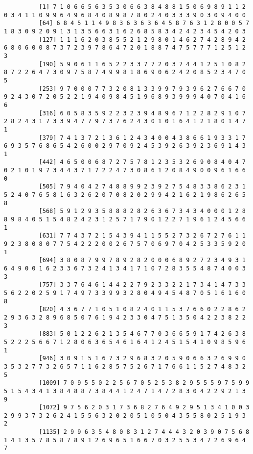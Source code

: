 \documentclass{article}
\begin{document}
\begin{itemize}
	\begin{scriptsize}
		\begin{verbatim}
		  [1] 7 1 0 6 6 5 6 3 5 3 0 6 6 3 8 4 8 8 1 5 0 6 9 8 9 1 1 2 0 3 4 1 1 0 9 9 6 4 9 6 8 4 0 8 9 8 7 8 0 2 4 0 3 3 3 9 0 3 0 9 4 0 0
		  [64] 6 8 4 5 1 1 4 9 8 3 6 3 6 3 6 4 5 8 7 6 3 1 2 8 0 0 5 7 1 8 3 0 9 2 0 9 1 3 1 3 5 6 6 3 1 6 2 6 8 5 8 3 4 2 4 2 3 4 5 4 2 0 3
		  [127] 1 1 1 6 2 0 3 8 5 5 2 1 2 9 8 0 1 4 6 2 7 4 2 8 9 4 2 6 8 0 6 0 0 8 7 3 7 2 3 9 7 8 6 4 7 2 0 1 8 8 7 4 7 5 7 7 7 1 2 5 1 2 3
		  [190] 5 9 0 6 1 1 6 5 2 2 3 3 7 7 2 0 3 7 4 4 1 2 5 1 0 8 2 8 7 2 2 6 4 7 3 0 9 7 5 8 7 4 9 9 8 1 8 6 9 0 6 2 4 2 0 8 5 2 3 4 7 0 5
		  [253] 9 7 0 0 0 7 7 3 2 0 8 1 3 3 9 9 7 9 3 9 6 2 7 6 6 7 0 9 2 4 3 0 7 2 0 5 2 2 1 9 4 0 9 8 4 5 1 9 6 8 9 3 9 9 9 4 0 7 0 4 1 6 6
		  [316] 6 0 5 8 3 5 9 2 2 3 2 3 9 4 8 9 6 7 1 2 2 8 2 9 1 0 7 2 8 2 4 3 1 7 3 3 9 4 7 7 9 7 3 7 6 2 4 3 0 1 0 1 6 4 1 2 1 8 0 1 4 7 1
		  [379] 7 4 1 3 7 2 1 3 6 1 2 4 3 4 0 0 4 3 8 6 6 1 9 3 3 1 7 6 9 3 5 7 6 8 6 5 4 2 6 0 0 2 9 7 0 9 2 4 5 3 9 2 6 3 9 2 3 6 9 1 4 3 1
		  [442] 4 6 5 0 0 6 8 7 2 7 5 7 8 1 2 3 5 3 2 6 9 0 8 4 0 4 7 0 2 1 0 1 9 7 3 4 4 3 7 1 7 2 2 4 7 3 0 8 6 1 2 0 8 4 9 0 0 9 6 1 6 6 0
		  [505] 7 9 4 0 4 2 7 4 8 8 9 9 2 3 9 2 7 5 4 8 3 3 8 6 2 3 1 5 2 4 0 7 6 5 8 1 6 3 2 6 2 0 7 0 8 2 0 2 9 9 4 2 1 6 2 1 9 8 6 2 6 5 8
		  [568] 5 9 1 2 9 3 5 8 8 8 2 8 2 6 3 6 7 3 4 3 4 0 0 0 1 2 8 8 9 8 4 0 5 1 5 4 8 2 4 2 3 1 2 5 7 1 7 9 0 1 2 2 7 1 9 6 1 2 4 5 6 6 1
		  [631] 7 7 4 3 7 2 1 5 4 3 9 4 1 1 5 5 2 7 3 2 6 7 2 7 6 1 1 9 2 3 8 0 8 0 7 7 5 4 2 2 2 0 0 2 6 7 5 7 0 6 9 7 0 4 2 5 3 3 5 9 2 0 1
		  [694] 3 8 0 8 7 9 9 7 8 9 2 8 2 0 0 0 6 8 9 2 7 2 3 4 9 3 1 6 4 9 0 0 1 6 2 3 3 6 7 3 2 4 1 3 4 1 7 1 0 7 2 8 3 5 5 4 8 7 4 0 0 3 3
		  [757] 3 3 7 6 4 6 1 4 4 2 2 7 9 2 3 3 2 2 1 7 3 4 1 4 7 3 3 5 6 2 2 0 2 5 9 1 7 4 9 7 3 3 9 9 3 2 8 0 4 9 4 5 4 8 7 0 5 1 6 1 6 0 8
		  [820] 4 3 6 7 7 1 0 5 1 0 8 2 4 0 1 1 5 3 7 6 6 0 2 2 8 6 2 2 9 3 6 3 2 8 9 6 8 5 0 7 6 1 9 4 2 3 3 0 4 7 5 1 3 5 0 4 2 2 3 8 2 2 3
		  [883] 5 0 1 2 2 6 2 1 3 5 4 6 7 7 0 3 6 6 5 9 1 7 4 2 6 3 8 5 2 2 2 5 6 6 7 1 2 8 0 6 3 6 5 4 6 1 6 4 1 2 4 5 1 5 4 1 0 9 8 5 9 6 1
		  [946] 3 0 9 1 5 1 6 7 3 2 9 6 8 3 2 0 5 9 0 6 6 3 2 6 9 9 0 3 5 3 2 7 7 3 2 6 5 7 1 1 6 2 8 5 7 5 2 6 7 1 7 6 6 1 1 5 2 7 4 8 3 2 5
		  [1009] 7 0 9 5 5 0 2 2 5 6 7 0 5 2 5 3 8 2 9 5 5 5 9 7 5 9 9 5 1 5 4 3 4 1 3 8 4 8 8 7 3 8 4 4 1 2 4 7 1 4 7 2 8 3 0 4 2 2 9 2 1 3 9
		  [1072] 9 7 5 6 2 0 3 1 7 3 6 8 2 7 6 4 9 2 9 5 1 3 4 1 0 0 3 2 9 9 3 7 3 2 6 2 4 1 5 5 6 3 2 0 2 0 5 1 0 5 0 4 3 5 5 8 0 2 5 1 9 3 2
		  [1135] 2 9 9 6 3 5 4 8 0 8 3 1 2 7 4 4 4 3 2 0 3 9 0 7 5 6 8 1 4 1 3 5 7 8 5 8 7 8 9 1 2 6 9 6 5 1 6 6 7 0 3 2 5 5 3 4 7 2 6 9 6 4 7

\end{verbatim}
\end{scriptsize}
\end{itemize}
\end{document}
